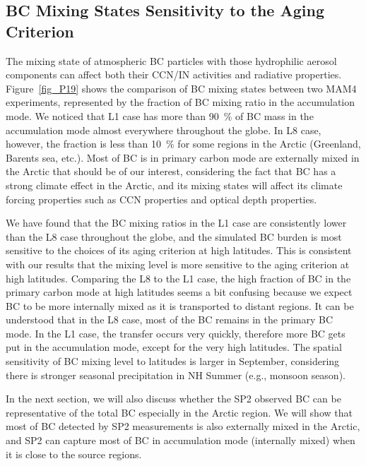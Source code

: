 \documentclass[12pt, fullpage]{uiucthesis2009}
\begin{document}
	\subsection{BC Mixing States Sensitivity to the Aging Criterion} 
	The mixing state of atmospheric BC particles with those hydrophilic aerosol components can affect both their CCN/IN activities and radiative properties. Figure~\ref{fig_P19} shows the comparison of BC mixing states between two MAM4 experiments, represented by the fraction of BC mixing ratio in the accumulation mode. We noticed that L1 case has more than 90~$\%$ of BC mass in the accumulation mode almost everywhere throughout the globe. In L8 case, however, the fraction is less than 10~$\%$ for some regions in the Arctic (Greenland, Barents sea, etc.). Most of BC is in primary carbon mode are externally mixed in the Arctic that should be of our interest, considering the fact that BC has a strong climate effect in the Arctic, and its mixing states will affect its climate forcing properties such as CCN properties and optical depth properties.  
	
	We have found that the BC mixing ratios in the L1 case are consistently lower than the L8 case throughout the globe, and the simulated BC burden is most sensitive to the choices of its aging criterion at high latitudes. This is consistent with our results that the mixing level is more sensitive to the aging criterion at high latitudes. Comparing the L8 to the L1 case, the high fraction of BC in the primary carbon mode at high latitudes seems a bit confusing because we expect BC to be more internally mixed as it is transported to distant regions. It can be understood that in the L8 case, most of the BC remains in the primary BC mode. In the L1 case, the transfer occurs very quickly, therefore more BC gets put in the accumulation mode, except for the very high latitudes. The spatial sensitivity of BC mixing level to latitudes is larger in September, considering there is stronger seasonal precipitation in NH Summer (e.g., monsoon season). 
	
	In the next section, we will also discuss whether the SP2 observed BC can be representative of the total BC especially in the Arctic region. We will show that most of BC detected by SP2 measurements is also externally mixed in the Arctic, and SP2 can capture most of BC in accumulation mode (internally mixed) when it is close to the source regions.
	
\end{document}
